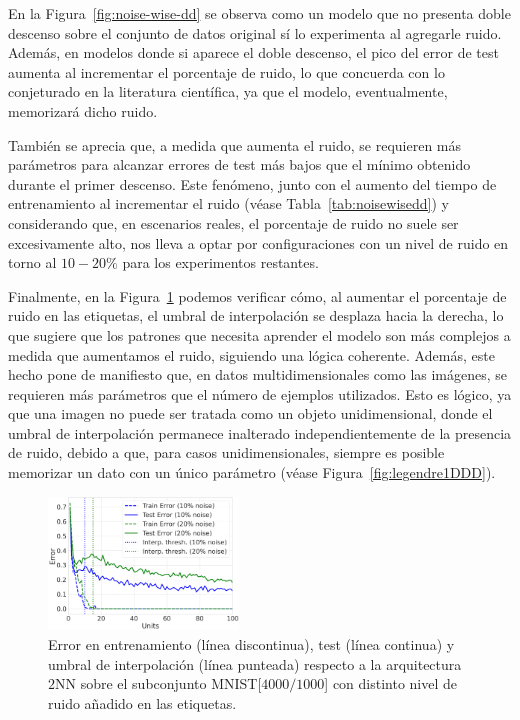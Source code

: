 En la Figura~\ref{fig:noise-wise-dd} se observa como un modelo que no presenta doble descenso sobre el conjunto de datos original sí lo experimenta al agregarle ruido. Además, en modelos donde si aparece el doble descenso, el pico del error de test aumenta al incrementar el porcentaje de ruido, lo que concuerda con lo conjeturado en la literatura científica, ya que el modelo, eventualmente, memorizará dicho ruido.

También se aprecia que, a medida que aumenta el ruido, se requieren más parámetros para alcanzar errores de test más bajos que el mínimo obtenido durante el primer descenso. Este fenómeno, junto con el aumento del tiempo de entrenamiento al incrementar el ruido (véase Tabla~\ref{tab:noisewisedd}) y considerando que, en escenarios reales, el porcentaje de ruido no suele ser excesivamente alto, nos lleva a optar por configuraciones con un nivel de ruido en torno al $10-20\%$ para los experimentos restantes.

Finalmente, en la Figura~\ref{fig:noise-wise-dd3} podemos verificar cómo, al aumentar el porcentaje de ruido en las etiquetas, el umbral de interpolación se desplaza hacia la derecha, lo que sugiere que los patrones que necesita aprender el modelo son más complejos a medida que aumentamos el ruido, siguiendo una lógica coherente. Además, este hecho pone de manifiesto que, en datos multidimensionales como las imágenes, se requieren más parámetros que el número de ejemplos utilizados. Esto es lógico, ya que una imagen no puede ser tratada como un objeto unidimensional, donde el umbral de interpolación permanece inalterado independientemente de la presencia de ruido, debido a que, para casos unidimensionales, siempre es posible memorizar un dato con un único parámetro (véase Figura~\ref{fig:legendre1DDD}).

\begin{figure}[h]
    \centering
    \includegraphics[width=0.45\textwidth]{img/experiments/noise-wise-dd3.png}
    \caption[Umbral de interpolación para el doble descenso con distintos niveles de ruido.]{Error en entrenamiento (línea discontinua), test (línea continua) y umbral de interpolación (línea punteada) respecto a la arquitectura $2$NN sobre el subconjunto MNIST[$4000/1000$] con distinto nivel de ruido añadido en las etiquetas.}\label{fig:noise-wise-dd3}
\end{figure}

